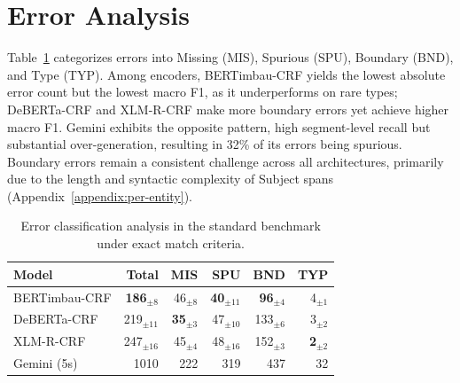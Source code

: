 \documentclass[11pt]{article}
\begin{document}
\section{Error Analysis}
\label{sec:error_analysis}


Table~\ref{tab:error_classification} categorizes errors into Missing (MIS), Spurious (SPU), Boundary (BND), and Type (TYP). Among encoders, BERTimbau-CRF yields the lowest absolute error count but the lowest macro F1, as it underperforms on rare types; DeBERTa-CRF and XLM-R-CRF make more boundary errors yet achieve higher macro F1. Gemini exhibits the opposite pattern, high segment-level recall but substantial over-generation, resulting in 32\% of its errors being spurious. Boundary errors remain a consistent challenge across all architectures, primarily due to the length and syntactic complexity of Subject spans (Appendix~\ref{appendix:per-entity}).

\begin{table}[ht!]
\centering
\footnotesize
\caption{Error classification analysis in the standard benchmark under exact match criteria.}
\label{tab:error_classification}
\setlength{\tabcolsep}{3pt}
\begin{tabular}{@{}lrrrrr@{}}
\toprule
\textbf{Model} & \textbf{Total} & \textbf{MIS} & \textbf{SPU} & \textbf{BND} & \textbf{TYP} \\
\midrule
BERTimbau-CRF & \textbf{186}$_{\pm 8}$  & 46$_{\pm 8}$          & \textbf{40}$_{\pm 11}$ & \textbf{96}$_{\pm 4}$  & 4$_{\pm 1}$          \\
DeBERTa-CRF   & 219$_{\pm 11}$          & \textbf{35}$_{\pm 3}$ & 47$_{\pm 10}$          & 133$_{\pm 6}$          & 3$_{\pm 2}$          \\
XLM-R-CRF     & 247$_{\pm 16}$          & 45$_{\pm 4}$          & 48$_{\pm 16}$          & 152$_{\pm 3}$          & \textbf{2}$_{\pm 2}$ \\
Gemini (5s)   & 1010                    & 222                   & 319                    & 437                    & 32                   \\
\bottomrule
\end{tabular}
\end{table}
\end{document}
